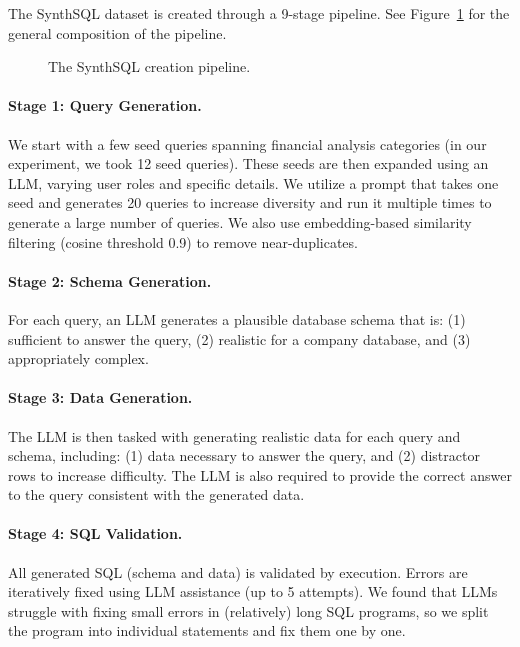 \documentclass[11pt]{article}
\newcommand{\synthsubset}{SynthSQL\xspace}
\begin{document}
The \synthsubset dataset is created through a 9-stage pipeline. See Figure~\ref{fig:pipeline} for the general composition of the pipeline.

\begin{figure}[t]
\centering

\caption{The \synthsubset creation pipeline.}
\label{fig:pipeline}
\end{figure}

\paragraph{Stage 1: Query Generation.}
We start with a few seed queries spanning financial analysis categories (in our experiment, we took 12 seed queries). These seeds are then expanded using an LLM, varying user roles and specific details. We utilize a prompt that takes one seed and generates 20 queries to increase diversity and run it multiple times to generate a large number of queries. We also use embedding-based similarity filtering (cosine threshold 0.9) to remove near-duplicates.

\paragraph{Stage 2: Schema Generation.}
For each query, an LLM generates a plausible database schema that is: (1) sufficient to answer the query, (2) realistic for a company database, and (3) appropriately complex.

\paragraph{Stage 3: Data Generation.}
The LLM is then tasked with generating realistic data for each query and schema, including: (1) data necessary to answer the query, and (2) distractor rows to increase difficulty. The LLM is also required to provide the correct answer to the query consistent with the generated data.

\paragraph{Stage 4: SQL Validation.}
All generated SQL (schema and data) is validated by execution. Errors are iteratively fixed using LLM assistance (up to 5 attempts). We found that LLMs struggle with fixing small errors in (relatively) long SQL programs, so we split the program into individual statements and fix them one by one.
\end{document}
